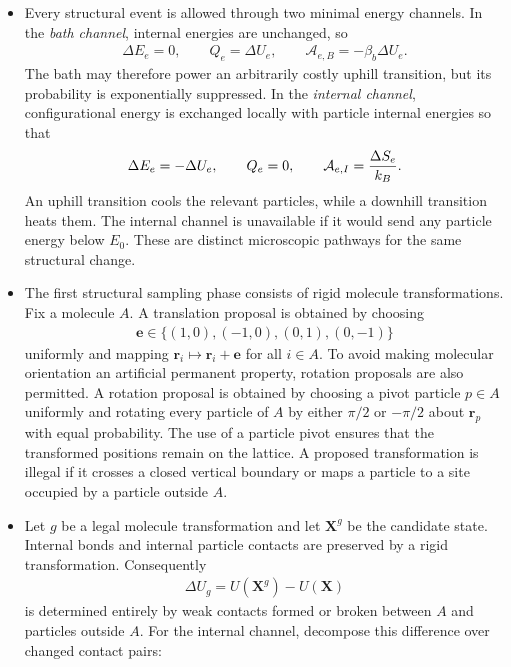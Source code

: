 \documentclass[12pt,letterpaper]{article}
\newcommand{\mb}{\mathbf}
\newcommand{\mc}{\mathcal}
\begin{document}
\begin{itemize}
\item Every structural event is allowed through two minimal energy channels. In the \emph{bath channel}, internal energies are unchanged, so
\begin{align*}
\Delta E_{e}=0, \qquad Q_{e}=\Delta U_{e}, \qquad \mc{A}_{e,B}=-\beta_{b}\Delta U_{e}.
\end{align*}
The bath may therefore power an arbitrarily costly uphill transition, but its probability is exponentially suppressed. In the \emph{internal channel}, configurational energy is exchanged locally with particle internal energies so that
\begin{align*}
\Delta E_{e}=-\Delta U_{e}, \qquad Q_{e}=0, \qquad \mc{A}_{e,I}={\Delta S_{e} \over k_{B}}.
\end{align*}
An uphill transition cools the relevant particles, while a downhill transition heats them. The internal channel is unavailable if it would send any particle energy below $E_{0}$. These are distinct microscopic pathways for the same structural change.
\item The first structural sampling phase consists of rigid molecule transformations. Fix a molecule $A$. A translation proposal is obtained by choosing
\begin{align*}
\mb{e}\in\{(1,0),(-1,0),(0,1),(0,-1)\}
\end{align*}
uniformly and mapping $\mb{r}_{i}\mapsto\mb{r}_{i}+\mb{e}$ for all $i\in A$. To avoid making molecular orientation an artificial permanent property, rotation proposals are also permitted. A rotation proposal is obtained by choosing a pivot particle $p\in A$ uniformly and rotating every particle of $A$ by either $\pi/2$ or $-\pi/2$ about $\mb{r}_{p}$ with equal probability. The use of a particle pivot ensures that the transformed positions remain on the lattice. A proposed transformation is illegal if it crosses a closed vertical boundary or maps a particle to a site occupied by a particle outside $A$.
\item Let $g$ be a legal molecule transformation and let $\mb{X}^{g}$ be the candidate state. Internal bonds and internal particle contacts are preserved by a rigid transformation. Consequently
\begin{align*}
\Delta U_{g}=U(\mb{X}^{g})-U(\mb{X})
\end{align*}
is determined entirely by weak contacts formed or broken between $A$ and particles outside $A$. For the internal channel, decompose this difference over changed contact pairs:
\begin{align*}

\end{align*}
\end{itemize}
\end{document}
